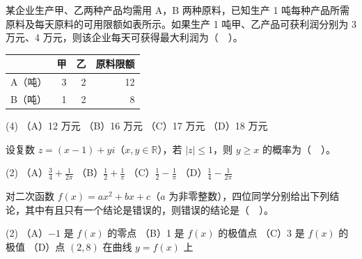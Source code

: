 \begin{question}

某企业生产甲、乙两种产品均需用 A，B 两种原料，已知生产 1 吨每种产品所需原料及每天原料的可用限额如表所示。如果生产 1 吨甲、乙产品可获利润分别为 3 万元、4 万元，则该企业每天可获得最大利润为（　）。

\begin{center}
\begin{tabular}{lrrr}
\toprule
 & 甲 & 乙 & 原料限额 \\
\midrule
A（吨） & 3 & 2 & 12 \\
B（吨） & 1 & 2 & 8 \\
\bottomrule
\end{tabular}
\end{center}

\begin{gkopts}(4)
\task （A）12 万元
\task （B）16 万元
\task （C）17 万元
\task （D）18 万元
\end{gkopts}

\end{question}
\begin{question}

设复数 $z=(x-1)+yi$（$x,y\in\mathbb R$），若 $|z|\leq1$，则 $y\geq x$ 的概率为（　）。

\begin{gkopts}(2)
\task （A）$\frac34+\frac1{2\pi}$
\task （B）$\frac12+\frac1\pi$
\task （C）$\frac12-\frac1\pi$
\task （D）$\frac14-\frac1{2\pi}$
\end{gkopts}

\end{question}
\begin{question}

对二次函数 $f(x)=ax^2+bx+c$（$a$ 为非零整数），四位同学分别给出下列结论，其中有且只有一个结论是错误的，则错误的结论是（　）。

\begin{gkopts}(2)
\task （A）$-1$ 是 $f(x)$ 的零点
\task （B）1 是 $f(x)$ 的极值点
\task （C）3 是 $f(x)$ 的极值
\task （D）点 $(2,8)$ 在曲线 $y=f(x)$ 上
\end{gkopts}

\end{question}

